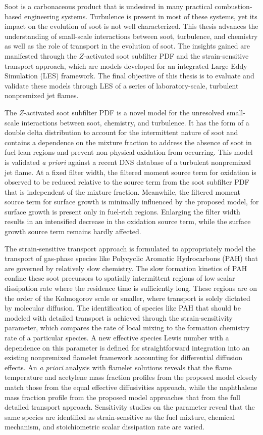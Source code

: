 Soot is a carbonaceous product that is undesired in many practical combustion-based engineering systems. Turbulence is present in most of these systems, yet its impact on the evolution of soot is not well characterized. This thesis advances the understanding of small-scale interactions between soot, turbulence, and chemistry as well as the role of transport in the evolution of soot. The insights gained are manifested through the $Z$-activated soot subfilter PDF and the strain-sensitive transport approach, which are models developed for an integrated Large Eddy Simulation (LES) framework. The final objective of this thesis is to evaluate and validate these models through LES of a series of laboratory-scale, turbulent nonpremixed jet flames.

The $Z$-activated soot subfilter PDF is a novel model for the unresolved small-scale interactions between soot, chemistry, and turbulence. It has the form of a double delta distribution to account for the intermittent nature of soot and contains a dependence on the mixture fraction to address the absence of soot in fuel-lean regions and prevent non-physical oxidation from occurring. This model is validated \textit{a priori} against a recent DNS database of a turbulent nonpremixed jet flame. At a fixed filter width, the filtered moment source term for oxidation is observed to be reduced relative to the source term from the soot subfilter PDF that is independent of the mixture fraction. Meanwhile, the filtered moment source term for surface growth is minimally influenced by the proposed model, for surface growth is present only in fuel-rich regions. Enlarging the filter width results in an intensified decrease in the oxidation source term, while the surface growth source term remains hardly affected.

The strain-sensitive transport approach is formulated to appropriately model the transport of gas-phase species like Polycyclic Aromatic Hydrocarbons (PAH) that are governed by relatively slow chemistry. The slow formation kinetics of PAH confine these soot precursors to spatially intermittent regions of low scalar dissipation rate where the residence time is sufficiently long. These regions are on the order of the Kolmogorov scale or smaller, where transport is solely dictated by molecular diffusion. The identification of species like PAH that should be modeled with detailed transport is achieved through the strain-sensitivity parameter, which compares the rate of local mixing to the formation chemistry rate of a particular species. A new effective species Lewis number with a dependence on this parameter is defined for straightforward integration into an existing nonpremixed flamelet framework accounting for differential diffusion effects. An \textit{a priori} analysis with flamelet solutions reveals that the flame temperature and acetylene mass fraction profiles from the proposed model closely match those from the equal effective diffusivities approach, while the naphthalene mass fraction profile from the proposed model approaches that from the full detailed transport approach. Sensitivity studies on the parameter reveal that the same species are identified as strain-sensitive as the fuel mixture, chemical mechanism, and stoichiometric scalar dissipation rate are varied.

